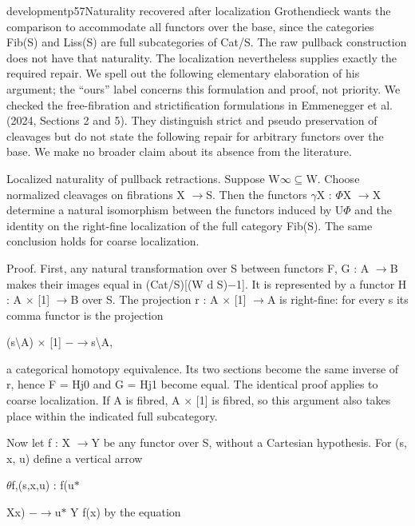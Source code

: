 \begin{dcomment}{development}{p57}{Naturality recovered after localization}
Grothendieck wants the comparison to accommodate all functors over the base, since the categories Fib(S) and Liss(S) are full subcategories of Cat/S. The raw pullback construction does not have that naturality. The localization nevertheless supplies exactly the required repair. We spell out the following elementary elaboration of his argument; the “ours” label concerns this formulation and proof, not priority. We checked the free-fibration and strictification formulations in Emmenegger et al. (2024, Sections 2 and 5). They distinguish strict and pseudo preservation of cleavages but do not state the following repair for arbitrary functors over the base. We make no broader claim about its absence from the literature.

Localized naturality of pullback retractions. \ours Suppose W\ensuremath{\infty}\ensuremath{\subseteq}W. Choose normalized cleavages on fibrations X \ensuremath{\to}S. Then the functors \ensuremath{\gamma}X : \ensuremath{\Phi}X \ensuremath{\to}X determine a natural isomorphism between the functors induced by U\ensuremath{\Phi} and the identity on the right-fine localization of the full category Fib(S). The same conclusion holds for coarse localization.

Proof. First, any natural transformation over S between functors F, G : A \ensuremath{\to}B makes their images equal in (Cat/S)[(W d S)\ensuremath{-}1]. It is represented by a functor H : A \ensuremath{\times} [1] \ensuremath{\to}B over S. The projection r : A \ensuremath{\times} [1] \ensuremath{\to}A is right-fine: for every s its comma functor is the projection

(s\textbackslash{}A) \ensuremath{\times} [1] \ensuremath{-}\ensuremath{\to}s\textbackslash{}A,

a categorical homotopy equivalence. Its two sections become the same inverse of r, hence F = Hj0 and G = Hj1 become equal. The identical proof applies to coarse localization. If A is fibred, A \ensuremath{\times} [1] is fibred, so this argument also takes place within the indicated full subcategory.

Now let f : X \ensuremath{\to}Y be any functor over S, without a Cartesian hypothesis. For (s, x, u) define a vertical arrow

\ensuremath{\theta}f,(s,x,u) : f(u\ensuremath{*}

Xx) \ensuremath{-}\ensuremath{\to}u\ensuremath{*} Y f(x) by the equation


\end{dcomment}
